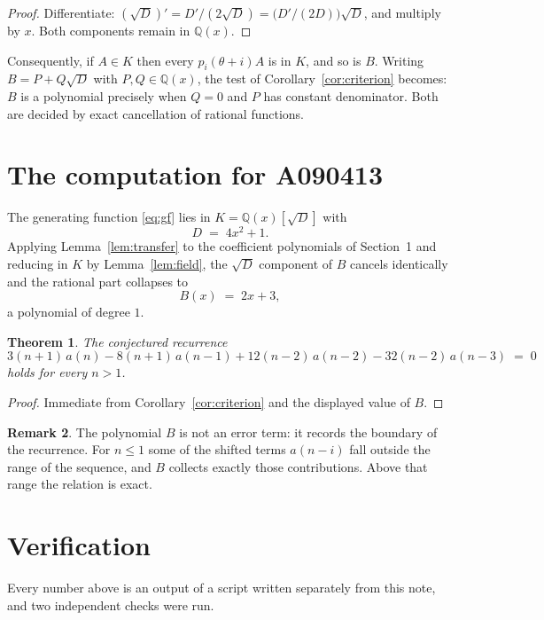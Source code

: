 \documentclass[11pt,a4paper]{article}
\theoremstyle{plain}
\newtheorem{theorem}{Theorem}
\theoremstyle{definition}
\newtheorem{remark}[theorem]{Remark}
\begin{document}
\begin{proof}
Differentiate: $(\sqrt{D})'=D'/(2\sqrt{D})=\bigl(D'/(2D)\bigr)\sqrt{D}$, and multiply by
$x$. Both components remain in $\mathbb{Q}(x)$.
\end{proof}

Consequently, if $A\in K$ then every $p_{i}(\theta+i)A$ is in $K$, and so is $B$. Writing
$B=P+Q\sqrt{D}$ with $P,Q\in\mathbb{Q}(x)$, the test of Corollary~\ref{cor:criterion}
becomes: $B$ is a polynomial precisely when $Q=0$ and $P$ has constant denominator. Both
are decided by exact cancellation of rational functions.

\section{The computation for A090413}

The generating function \eqref{eq:gf} lies in $K=\mathbb{Q}(x)[\sqrt{D}]$ with
\[
D \;=\; 4 x^{2} + 1 .
\]
Applying Lemma~\ref{lem:transfer} to the coefficient polynomials of Section~1 and reducing
in $K$ by Lemma~\ref{lem:field}, the $\sqrt{D}$ component of $B$ cancels identically and
the rational part collapses to
\[
B(x)\;=\;2 x + 3 ,
\]
a polynomial of degree $1$.

\begin{theorem}
The conjectured recurrence
\[
3 \left(n + 1\right)\,a(n) -  8 \left(n + 1\right)\,a(n-1) + 12 \left(n - 2\right)\,a(n-2) -  32 \left(n - 2\right)\,a(n-3) \;=\;0
\]
holds for every $n>1$.
\end{theorem}

\begin{proof}
Immediate from Corollary~\ref{cor:criterion} and the displayed value of $B$.
\end{proof}

\begin{remark}
The polynomial $B$ is not an error term: it records the boundary of the recurrence. For
$n\le1$ some of the shifted terms $a(n-i)$ fall outside the range of the sequence,
and $B$ collects exactly those contributions. Above that range the relation is exact.
\end{remark}

\section{Verification}

Every number above is an output of a script written separately from this note, and two
independent checks were run.
\end{document}
